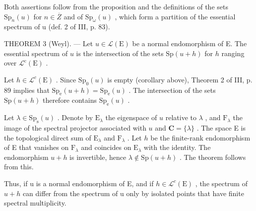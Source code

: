Both assertions follow from the proposition and the definitions of the sets \(\mathrm{Sp}_{n}(u)\) for \(n \in \overline{Z}\) and of \(\mathrm{Sp}_{\omega}(u)\) , which form a partition of the essential spectrum of u (def. 2 of III, p. 83).

THEOREM 3 (Weyl). --- Let \(u \in \mathcal{L}(\mathrm{E})\) be a normal endomorphism of E. The essential spectrum of \(u\) is the intersection of the sets \(\mathrm{Sp}(u + h)\) for \(h\) ranging over \(\mathcal{L}^{\mathrm{c}}(\mathrm{E})\) .

Let \(h \in \mathcal{L}^c(\mathrm{E})\) . Since \(\mathrm{Sp}_0(u)\) is empty (corollary above), Theorem 2 of III, p. 89 implies that \(\mathrm{Sp_e}(u + h) = \mathrm{Sp_e}(u)\) . The intersection of the sets \(\mathrm{Sp}(u + h)\) therefore contains \(\mathrm{Sp_e}(u)\) .

Let \(\lambda \in \mathrm{Sp}_{\mathrm{s}}(u)\) . Denote by \(\mathrm{E}_{\lambda}\) the eigenspace of \(u\) relative to \(\lambda\) , and \(\mathrm{F}_{\lambda}\) the image of the spectral projector associated with \(u\) and \(\mathbf{C} = \{\lambda\}\) . The space E is the topological direct sum of \(\mathrm{E}_{\lambda}\) and \(\mathrm{F}_{\lambda}\) . Let \(h\) be the finite-rank endomorphism of E that vanishes on \(\mathrm{F}_{\lambda}\) and coincides on \(\mathrm{E}_{\lambda}\) with the identity. The endomorphism \(u + h\) is invertible, hence \(\lambda \notin \mathrm{Sp}(u + h)\) . The theorem follows from this.

Thus, if u is a normal endomorphism of E, and if \(h \in \mathcal{L}^{c}(\mathrm{E})\) , the spectrum of \(u + h\) can differ from the spectrum of u only by isolated points that have finite spectral multiplicity.
